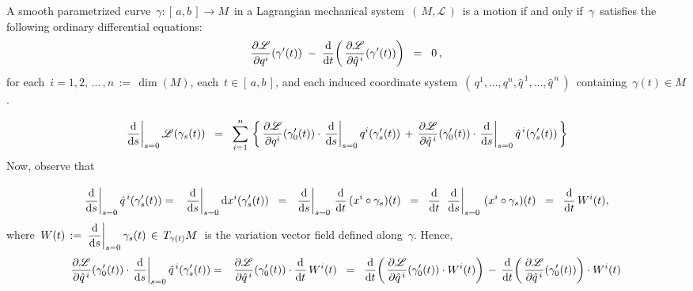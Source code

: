 \vskip 0.5cm
\begin{proposition}
\label{EulerLagrangeEquations}
\mbox{}
\vskip 0.1cm
\noindent
A smooth parametrized curve
\,$\gamma : [\,a,b\,] \longrightarrow M$\,
in a Lagrangian mechanical system
\,$\left(\,M,\mathscr{L}\,\right)$\,
is a motion if and only if
\,$\gamma$\,
satisfies the following ordinary differential equations:
\begin{equation*}
\dfrac{\partial\mathscr{L}}{\partial q^{i}}\!\left(\gamma^{\prime}(t)\right)
\; - \;
\dfrac{\textnormal{d}}{\textnormal{d} t}\!\left(\,\dfrac{\partial\mathscr{L}}{\partial \hat{q}^{\,i}}\!\left(\gamma^{\prime}(t)\right)\right)
\;\; = \;\;
0\,,
\end{equation*}
for each \,$i = 1, 2, \,\ldots\, , n \,:=\, \dim(M)$,
each \,$t \in [\,a,b\,]$, and
each induced coordinate system \,$\left(\,q^{1},\ldots,q^{n},\hat{q}^{\,1},\ldots,\hat{q}^{\,n}\,\right)$\,
containing \,$\gamma(t) \in M$.
\end{proposition}
\proof
\begin{equation}\label{VariationVectorField}
\left.\dfrac{\textnormal{d}}{\textnormal{d} s}\right\vert_{s=0} \mathscr{L}\!\left(\gamma_{s}(t)\right)
\;\; = \;\;
	\overset{n}{\underset{i=1}{\sum}}\,\left\{\,
		\dfrac{\partial\mathscr{L}}{\partial q^{i}}\!\left(\gamma^{\prime}_{0}(t)\right)
		\cdot
		\left.\dfrac{\textnormal{d}}{\textnormal{d} s}\right\vert_{s=0} q^{i}(\gamma^{\prime}_{s}(t))
		\, + \,
		\dfrac{\partial\mathscr{L}}{\partial\hat{q}^{\,i}}\!\left(\gamma^{\prime}_{0}(t)\right)
		\cdot
		\left.\dfrac{\textnormal{d}}{\textnormal{d} s}\right\vert_{s=0} \hat{q}^{\,i}(\gamma^{\prime}_{s}(t))
		\,\right\}
\end{equation}
Now, observe that
\begin{eqnarray*}
\left.\dfrac{\d}{\d s}\right\vert_{s=0} \hat{q}^{\,i}(\gamma^{\prime}_{s}(t))
& = &
	\left.\dfrac{\d}{\d s}\right\vert_{s=0} \d x^{i}(\gamma^{\prime}_{s}(t))
\;\; = \;\;
	\left.\dfrac{\d}{\d s}\right\vert_{s=0} \, \dfrac{\d}{\d t}\,(x^{i}\circ\gamma_{s})(t)
\;\; = \;\;
	\dfrac{\d}{\d t}\; \left.\dfrac{\d}{\d s}\right\vert_{s=0} \, (x^{i}\circ\gamma_{s})(t)
\;\; = \;\;
	\overset{{\color{white}1}}{\dfrac{\d}{\d t}}\, W^{i}(t),
\end{eqnarray*}
where
\,$W(t) \,:=\, \left.\dfrac{\textnormal{d}}{\textnormal{d} s}\right\vert_{s=0} \gamma_{s}(t) \,\in\, T_{\gamma(t)}M$\,
is the variation vector field defined along \,$\gamma$.
Hence,
\begin{eqnarray*}
\dfrac{\partial\mathscr{L}}{\partial\hat{q}^{\,i}}\!\left(\gamma^{\prime}_{0}(t)\right)
\cdot
\left.\dfrac{\textnormal{d}}{\textnormal{d} s}\right\vert_{s=0} \hat{q}^{\,i}(\gamma^{\prime}_{s}(t))
& = &
	\dfrac{\partial\mathscr{L}}{\partial\hat{q}^{\,i}}\!\left(\gamma^{\prime}_{0}(t)\right)
	\cdot
	\dfrac{\textnormal{d}}{\textnormal{d} t}\, W^{i}(t)	
\;\; = \;\;
	\dfrac{\textnormal{d}}{\textnormal{d} t}\!\left(\,
		\dfrac{\partial\mathscr{L}}{\partial\hat{q}^{\,i}}\!\left(\gamma^{\prime}_{0}(t)\right)
		\cdot
		W^{i}(t)
		\right)
	\, - \,
	\dfrac{\textnormal{d}}{\textnormal{d} t}\!\left(\,
		\dfrac{\partial\mathscr{L}}{\partial\hat{q}^{\,i}}\!\left(\gamma^{\prime}_{0}(t)\right)
		\right)	
	\cdot
	W^{i}(t)
\end{eqnarray*}
